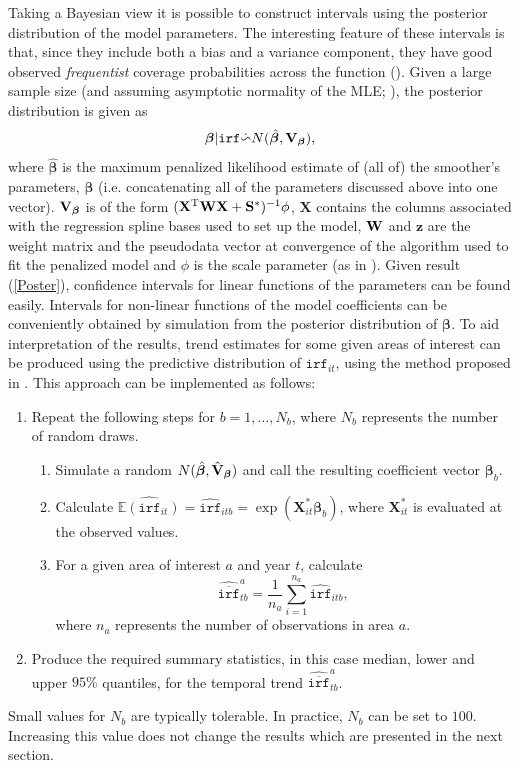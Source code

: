 Taking a Bayesian view it is possible to construct intervals using the posterior distribution of the model parameters. The interesting feature of these intervals is that, since they include both a bias and a variance component, they have good observed \textit{frequentist} coverage probabilities across the function (\cite{Marra2011}). Given a large sample size (and assuming asymptotic normality of the MLE; \label{cor-r24}), the posterior distribution is given as
\begin{equation}
\bm\beta|\texttt{irf} \dot{\backsim} N( \hat{\bm\beta}, {\bf V}_{\bm\beta} ),
\label{Poster}
\end{equation}
where $\hat{\bm\beta}$ is the maximum penalized likelihood estimate of (all of) the smoother's parameters, $\bm\beta$ (i.e. concatenating all of the parameters discussed above into one vector). ${\bf V}_{\bm\beta}$ is of the form $(\mathbf{X}^\text{T}{\bf W}\mathbf{X}+{\bf S}^*)^{-1}\phi$, $\mathbf{X}$ contains the columns associated with the regression spline bases used to set up the model, ${\bf W}$ and $\mathbf{z}$ are the weight matrix and the pseudodata vector at convergence of the algorithm used to fit the penalized model and $\phi$ is the scale parameter (as in ). Given result (\ref{Poster}), confidence intervals for linear functions of the parameters can be found easily. Intervals for non-linear functions of the model coefficients can be conveniently obtained by simulation from the posterior distribution of $\bm\beta$. To aid interpretation of the results, trend estimates for some given areas of interest can be produced using the predictive distribution of $\texttt{irf}_{it}$, using the method proposed in . This approach can be implemented as follows:

\begin{enumerate}
	\item Repeat the following steps for $b=1,\ldots,N_b$, where $N_b$ represents the number of random draws. 
	   \begin{enumerate}
	      \item Simulate a random $N(\hat{\bm\beta}, \hat{{\bf V}}_{\bm\beta} )$ and call the resulting coefficient vector $\bm\beta_b$.
	      \item Calculate $\widehat{\mathbb{E}(\texttt{irf}_{it})}=\widehat{\texttt{irf}}_{itb}=\exp(\mathbf{X}^*_{it}\bm\beta_b)$, where $\mathbf{X}^*_{it}$ is evaluated at the observed values. 
	      \item For a given area of interest $a$ and year $t$, calculate
	      $$\widehat{\overline{\texttt{irf}}}_{tb}^a=\frac{1}{n_a}\sum_{i=1}^{n_a} \widehat{\texttt{irf}}_{itb},$$
	      where $n_a$ represents the number of observations in area $a$.     
	   \end{enumerate}
	\item Produce the required summary statistics, in this case median, lower and upper $95\%$ quantiles, for the temporal trend $\widehat{\overline{\texttt{irf}}}_{tb}^a$.
\end{enumerate}
Small values for $N_b$ are typically tolerable. In practice, $N_b$ can be set to $100$. Increasing this value does not change the results which are presented in the next section.
 

